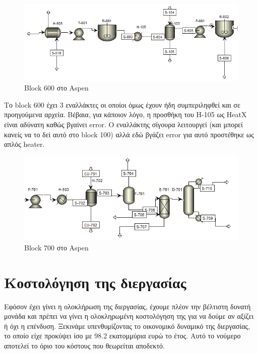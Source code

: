 \documentclass[11pt]{article}
\begin{document}
\begin{figure}[htbp]
\centering
\includegraphics[width=.9\linewidth]{Blocks_της_διεργασίας_μετά_την_ενεργειακή_ολοκλήρωση/2023-04-27_15-00-23_screenshot.png}
\caption{Block 600 στο Aspen}
\end{figure}

Το block 600 έχει 3 εναλλάκτες οι οποίοι όμως έχουν ήδη συμπεριληφθεί και σε προηγούμενα αρχεία. Βέβαια, για κάποιον λόγο, η προσθήκη του H-105 ως HeatX είναι αδύνατη καθώς βγαίνει error. Ο εναλλάκτης σίγουρα λειτουργεί (και μπορεί κανείς να το δεί αυτό στο block 100) αλλά εδώ βγάζει error για αυτό προστέθηκε ως απλός heater.

\begin{figure}[htbp]
\centering
\includegraphics[width=.9\linewidth]{Blocks_της_διεργασίας_μετά_την_ενεργειακή_ολοκλήρωση/2023-04-27_15-02-15_screenshot.png}
\caption{Block 700 στο Aspen}
\end{figure}

\pagebreak

\section{Κοστολόγηση της διεργασίας}
\label{sec:org92d4e22}
Εφόσον έχει γίνει η ολοκλήρωση της διεργασίας, έχουμε πλέον την βέλτιστη δυνατή μονάδα και πρέπει να γίνει η ολοκληρωμένη κοστολόγηση της για να δούμε αν αξίζει ή όχι η επένδυση. Ξεκινάμε υπενθυμίζοντας το οικονομικό δυναμικό της διεργασίας, το οποίο είχε προκύψει ίσο με 98.2 εκατομμύρια ευρώ το έτος. Αυτό το νούμερο αποτελεί το όριο του κόστους που θεωρείται αποδεκτό.
\end{document}
